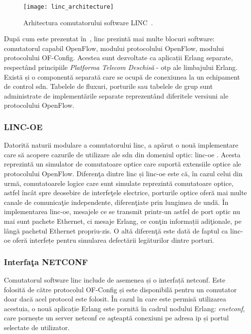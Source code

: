 \begin{figure}[h]
	\centering
	\texttt{[image: linc\_architecture]}
	\caption{Arhitectura comutatorului software LINC~\cite{linc2014qsg}.}
	\label{fig:linc_architecture}
\end{figure}

După cum este prezentat în~\cite{linc2014qsg}, \gls{linc} prezintă mai multe blocuri software: comutatorul capabil OpenFlow, modului protocolului OpenFlow, modului protocolului OF-Config. Acestea sunt dezvoltate ca aplicații Erlang separate, respectând principiile \textit{Platforma Telecom Deschisă} - \gls{otp} ale limbajului Erlang. Există și o componentă separată care se ocupă de conexiunea la un echipament de control \gls{sdn}. Tabelele de fluxuri, porturile sau tabelele de grup sunt administrate de implementările separate reprezentând diferitele versiuni ale protocolului OpenFlow.

\subsubsection{LINC-OE}

Datorită naturii modulare a comutatorului \gls{linc}, a apărut o nouă implementare care să acopere cazurile de utilizare ale \gls{sdn} din domeniul optic: \gls{linc-oe} \cite{parulkar2015sdn}. Acesta reprezintă un simulator de comutatoare optice care suportă extensiile optice ale protocolului OpenFlow. Diferenţa dintre \gls{linc} și \gls{linc-oe} este că, în cazul celui din urmă, comutatoarele logice care sunt simulate reprezintă comutatoare optice, astfel încât spre deosebire de interfeţele electrice, porturile optice oferă mai multe canale de comunicaţie independente, diferenţiate prin lungimea de undă. În implementarea \gls{linc-oe}, mesajele ce se transmit printr-un astfel de port optic nu mai sunt pachete Ethernet, ci mesaje Erlang, ce conţin informații adiţionale, pe lângă pachetul Ethernet propriu-zis. O altă diferenţă este dată de faptul ca \gls{linc-oe} oferă interfețe pentru simularea defectării legăturilor dintre porturi.

\subsubsection{Interfaţa NETCONF}

Comutatorul software \gls{linc} include de asemenea și o interfață \gls{netconf}. Este folosită de către protocolul OF-Config și este disponibilă pentru un comutator doar dacă acel protocol este folosit. În cazul în care este permisă utilizarea acestuia, o nouă aplicație Erlang este pornită în cadrul nodului Erlang: \textit{enetconf}, care pornește un server \gls{netconf} ce aşteaptă conexiuni pe adresa \gls{ip} și portul selectate de utilizator.

